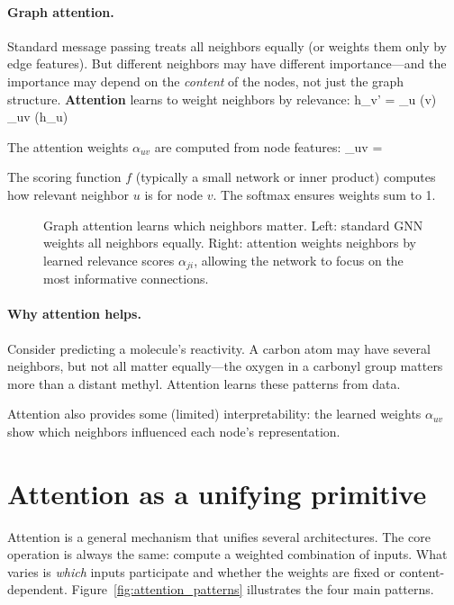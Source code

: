 \documentclass[11pt]{article}
\begin{document}
\paragraph{Graph attention.} Standard message passing treats all neighbors equally (or weights them only by edge features). But different neighbors may have different importance---and the importance may depend on the \emph{content} of the nodes, not just the graph structure.
\textbf{Attention} learns to weight neighbors by relevance:
\beq
h_v' = \sum_{u \in {}(v)} \alpha_{uv} \cdot \psi(h_u)
\eeq

The attention weights $\alpha_{uv}$ are computed from node features:
\beq
\alpha_{uv} = 
\eeq

The scoring function $f$ (typically a small network or inner product) computes how relevant neighbor $u$ is for node $v$. The softmax ensures weights sum to 1.

\begin{figure}[h]
\centering

\caption{Graph attention learns which neighbors matter. Left: standard GNN weights all neighbors equally. Right: attention weights neighbors by learned relevance scores $\alpha_{ji}$, allowing the network to focus on the most informative connections.}
\label{fig:graph_attention}
\end{figure}

\paragraph{Why attention helps.} Consider predicting a molecule's reactivity. A carbon atom may have several neighbors, but not all matter equally---the oxygen in a carbonyl group matters more than a distant methyl. Attention learns these patterns from data.

Attention also provides some (limited) interpretability: the learned weights $\alpha_{uv}$ show which neighbors influenced each node's representation.

\section{Attention as a unifying primitive}

Attention is a general mechanism that unifies several architectures. The core operation is always the same: compute a weighted combination of inputs. What varies is \emph{which} inputs participate and whether the weights are fixed or content-dependent. Figure~\ref{fig:attention_patterns} illustrates the four main patterns.
\end{document}
